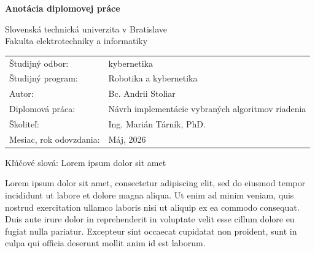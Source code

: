 \thispagestyle{empty}


\noindent 
\textsf{\textbf{\Large Anotácia diplomovej práce}}

\medskip



\noindent
Slovenská technická univerzita v Bratislave \\
Fakulta elektrotechniky a informatiky

\bigskip
\noindent
\begin{tabular}{@{}l l}
Študijný odbor: & kybernetika \\
Študijný program: & Robotika a kybernetika \\
Autor: & Bc. Andrii Stoliar \\
Diplomová práca: & Návrh implementácie vybraných algoritmov riadenia \\
Školiteľ: & Ing. Marián Tárník, PhD. \\
Mesiac, rok odovzdania: & Máj, 2026 \\
\end{tabular}

\bigskip
\noindent
Kľúčové slová: Lorem ipsum dolor sit amet

\bigskip
\noindent
Lorem ipsum dolor sit amet, consectetur adipiscing elit, sed do eiusmod tempor incididunt ut labore et dolore magna aliqua. Ut enim ad minim veniam, quis nostrud exercitation ullamco laboris nisi ut aliquip ex ea commodo consequat. Duis aute irure dolor in reprehenderit in voluptate velit esse cillum dolore eu fugiat nulla pariatur. Excepteur sint occaecat cupidatat non proident, sunt in culpa qui officia deserunt mollit anim id est laborum.


\pagebreak